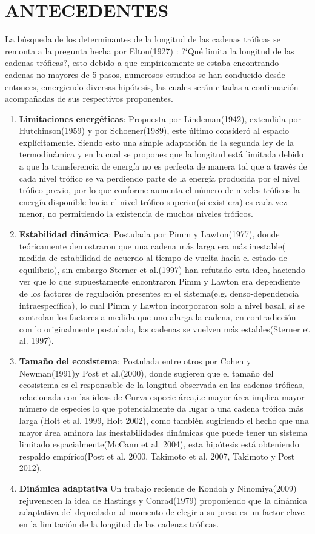 \documentclass[a4paper,11pt]{article}
\begin{document}
\section{ANTECEDENTES}
La b\'usqueda de los determinantes de la longitud de las cadenas tr\'oficas se remonta a la pregunta hecha por Elton(1927) : ?`Qu\'e limita la longitud de las cadenas tr\'oficas?, esto debido a que emp\'iricamente se estaba encontrando cadenas no mayores de 5 pasos, numerosos estudios se han conducido desde entonces, emergiendo diversas hip\'otesis, las cuales ser\'an citadas a continuaci\'on acompa\~nadas de sus respectivos proponentes.\\
\begin{enumerate}
\item \textbf{Limitaciones energ\'eticas}: Propuesta por Lindeman(1942), extendida por Hutchinson(1959) y por Schoener(1989), este \'ultimo consider\'o al espacio expl\'icitamente. Siendo esto una simple adaptaci\'on de la segunda ley de la termodin\'amica y en la cual se propones que la longitud est\'a limitada debido a que la transferencia de energ\'ia no es perfecta de manera tal que a trav\'es de cada nivel tr\'ofico se va perdiendo parte de la energ\'ia producida por el nivel tr\'ofico previo, por lo que conforme aumenta el n\'umero de niveles tr\'oficos la energ\'ia disponible hacia el nivel tr\'ofico superior(si existiera) es cada vez menor, no permitiendo la existencia de muchos niveles tr\'oficos.
\item \textbf{Estabilidad din\'amica}: Postulada por Pimm y Lawton(1977), donde te\'oricamente demostraron que una cadena m\'as larga era m\'as inestable( medida de estabilidad de acuerdo al tiempo de vuelta hacia el estado de equilibrio), sin embargo Sterner et al.(1997) han refutado esta idea, haciendo ver que lo que supuestamente encontraron Pimm y Lawton era dependiente de los factores de regulaci\'on presentes en el sistema(e.g. denso-dependencia intraespec\'ifica), lo cual Pimm y Lawton incorporaron solo a nivel basal, si se controlan los factores a medida que uno alarga la cadena, en contradicci\'on con lo originalmente postulado, las cadenas se vuelven m\'as estables(Sterner et al. 1997).
\item \textbf{Tama\~no del ecosistema}: Postulada entre otros por Cohen y Newman(1991)y Post et al.(2000), donde sugieren que el tama\~no del ecosistema es el responsable de la longitud observada en las cadenas tr\'oficas, relacionada con las ideas de Curva especie-\'area,i.e mayor \'area implica mayor n\'umero de especies lo que potencialmente da lugar a una cadena tr\'ofica m\'as larga (Holt et al. 1999, Holt 2002), como tambi\'en sugiriendo el hecho que una mayor \'area aminora las inestabilidades din\'amicas  que puede tener un sistema limitado espacialmente(McCann et al. 2004), esta hip\'otesis est\'a obteniendo respaldo emp\'irico(Post et al. 2000, Takimoto et al. 2007, Takimoto y Post 2012).
\item \textbf{Din\'amica adaptativa} Un trabajo reciende de Kondoh y Ninomiya(2009) rejuvenecen la idea de Hastings y Conrad(1979) proponiendo que la din\'amica adaptativa del depredador al momento de elegir a su presa es un factor clave en la limitaci\'on de la longitud de las cadenas tr\'oficas.
\end{enumerate}
\end{document}

